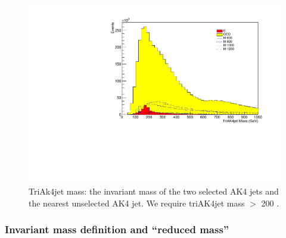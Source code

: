 \begin{figure}[h]
\begin{center}
\includegraphics[scale=0.5]{F5/shapeinvmsnAK4cl.pdf}
\end{center}
\caption{TriAk4jet mass: the invariant mass of the two selected AK4 jets and the nearest unselected AK4 jet. We require triAK4jet mass $>$ 200 \GeV.}
\label{fig:triak4jetm}
\end{figure} 


\subsubsection{Invariant mass definition and ``reduced mass''\label{sss:DijetMassDef}}

